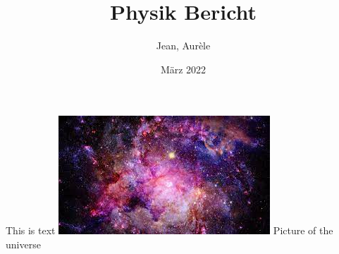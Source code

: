 \documentclass{report}
\title{Physik Bericht}
\author{Jean, Aurèle}
\date{März 2022}
\begin{document}
\maketitle
This is text
\includegraphics{universe.jpg}
Picture of the universe
\end{document}
